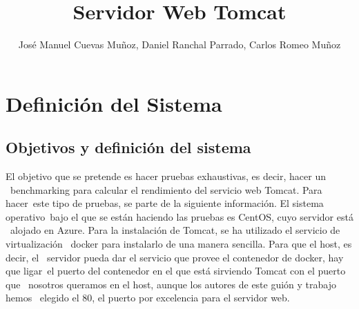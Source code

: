 \documentclass[11pt,twoside,a4paper]{book}
\title{\Huge Servidor Web Tomcat}
\author{José Manuel Cuevas Muñoz, Daniel Ranchal Parrado, Carlos Romeo Muñoz}
\date{\parbox{\linewidth}{\centering%
  \today\endgraf\bigskip
  32 horas de trabajo}}
\begin{document}
\maketitle
%
%

\renewcommand\bibname{Bibliografía}
\renewcommand\tablename{Tabla}

 \fancyhf{} \pagestyle{fancy}
\fancyhead[LO]{\rightmark} %
\fancyhead[RE]{\leftmark} %
\fancyhead[RO,LE]{\thepage} %
\setlength{\headheight}{14pt}
\renewcommand{\sectionmark}[1]{\markright{{\thesection. #1}}} %
\tableofcontents
\listoffigures
%
%

\chapter{Definición del Sistema}
\section{Objetivos y definición del sistema}
El objetivo que se pretende es hacer pruebas exhaustivas, es decir, hacer un \
benchmarking para calcular el rendimiento del servicio web Tomcat. Para hacer\
este tipo de pruebas, se parte de la siguiente información. El sistema operativo\
bajo el que se están haciendo las pruebas es CentOS, cuyo servidor está \
alojado en Azure.
\newline
Para la instalación de Tomcat, se ha utilizado el servicio de virtualización \
docker para instalarlo de una manera sencilla. Para que el host, es decir, el \
servidor pueda dar el servicio que provee el contenedor de docker, hay que ligar\
el puerto del contenedor en el que está sirviendo Tomcat con el puerto que \
nosotros queramos en el host, aunque los autores de este guión y trabajo hemos \
elegido el 80, el puerto por excelencia para el servidor web.
\end{document}
